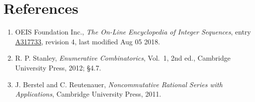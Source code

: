 \documentclass[11pt]{article}
\theoremstyle{definition}
\begin{document}
\section{References}

\begin{enumerate}

\item OEIS Foundation Inc., \emph{The On-Line Encyclopedia of Integer Sequences}, entry \href{https://oeis.org/A317733}{A317733}, revision 4, last modified Aug 05 2018.

\item R. P. Stanley, \emph{Enumerative Combinatorics}, Vol.~1, 2nd ed., Cambridge University Press, 2012; \S4.7.

\item J. Berstel and C. Reutenauer, \emph{Noncommutative Rational Series with Applications}, Cambridge University Press, 2011.

\end{enumerate}
\end{document}
